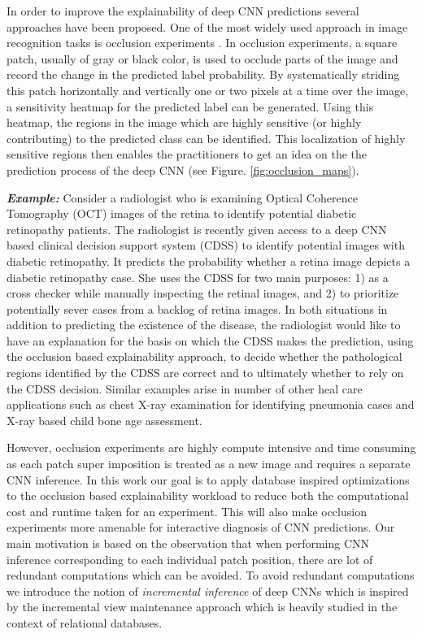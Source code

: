 In order to improve the explainability of deep CNN predictions several approaches have been proposed.
One of the most widely used approach in image recognition tasks is occlusion experiments \cite{zeiler2014visualizing}.
In occlusion experiments, a square patch, usually of gray or black color, is used to occlude parts of the image and record the change in the predicted label probability.
By systematically striding this patch horizontally and vertically one or two pixels at a time over the image, a sensitivity heatmap for the predicted label can be generated.
Using this heatmap, the regions in the image which are highly sensitive (or highly contributing) to the predicted class can be identified.
This localization of highly sensitive regions then enables the practitioners to get an idea on the the prediction process of the deep CNN (see Figure. \ref{fig:occlusion_maps}).

\textbf{\textit{Example:}} Consider a radiologist who is examining Optical Coherence Tomography (OCT) images of the retina to identify potential diabetic retinopathy patients.
The radiologist is recently given access to a deep CNN based clinical decision support system (CDSS) to identify potential images with diabetic retinopathy. 
It predicts the probability whether a retina image depicts a diabetic retinopathy case.
She uses the CDSS for two main purposes: 1) as a cross checker while manually inspecting the retinal images, and 2) to prioritize potentially sever cases from a backlog of retina images.
In both situations in addition to predicting the existence of the disease, the radiologist would like to have an explanation for the basis on which the CDSS makes the prediction, using the occlusion based explainability approach, to decide whether the pathological regions identified by the CDSS are correct and to ultimately whether to rely on the CDSS decision. Similar examples arise in number of other heal care applications such as chest X-ray examination for identifying pneumonia cases and X-ray based child bone age assessment.

However, occlusion experiments are highly compute intensive and time consuming as each patch super imposition is treated as a new image and requires a separate CNN inference.
In this work our goal is to apply database inspired optimizations to the occlusion based explainability workload to reduce both the computational cost and runtime taken for an experiment.
This will also make occlusion experiments more amenable for interactive diagnosis of CNN predictions.
Our main motivation is based on the observation that when performing CNN inference corresponding to each individual patch position, there are lot of redundant computations which can be avoided.
To avoid redundant computations we introduce the notion of \textit{incremental inference} of deep CNNs which is inspired by the incremental view maintenance approach which is heavily studied in the context of relational databases.

